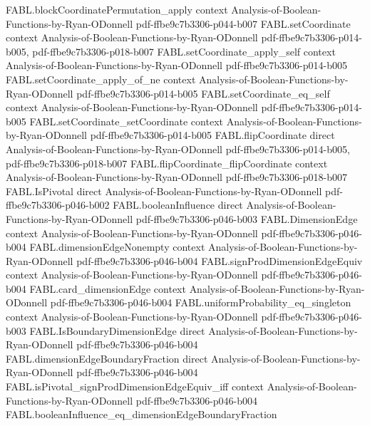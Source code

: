 \begin{theorem}
\proofstep
  {FABL.blockCoordinatePermutation_apply}
  {context}
  {Analysis-of-Boolean-Functions-by-Ryan-ODonnell}
  {pdf-ffbe9c7b3306-p044-b007}
\proofstep
  {FABL.setCoordinate}
  {context}
  {Analysis-of-Boolean-Functions-by-Ryan-ODonnell}
  {pdf-ffbe9c7b3306-p014-b005,
    pdf-ffbe9c7b3306-p018-b007}
\proofstep
  {FABL.setCoordinate_apply_self}
  {context}
  {Analysis-of-Boolean-Functions-by-Ryan-ODonnell}
  {pdf-ffbe9c7b3306-p014-b005}
\proofstep
  {FABL.setCoordinate_apply_of_ne}
  {context}
  {Analysis-of-Boolean-Functions-by-Ryan-ODonnell}
  {pdf-ffbe9c7b3306-p014-b005}
\proofstep
  {FABL.setCoordinate_eq_self}
  {context}
  {Analysis-of-Boolean-Functions-by-Ryan-ODonnell}
  {pdf-ffbe9c7b3306-p014-b005}
\proofstep
  {FABL.setCoordinate_setCoordinate}
  {context}
  {Analysis-of-Boolean-Functions-by-Ryan-ODonnell}
  {pdf-ffbe9c7b3306-p014-b005}
\proofstep
  {FABL.flipCoordinate}
  {direct}
  {Analysis-of-Boolean-Functions-by-Ryan-ODonnell}
  {pdf-ffbe9c7b3306-p014-b005,
    pdf-ffbe9c7b3306-p018-b007}
\proofstep
  {FABL.flipCoordinate_flipCoordinate}
  {context}
  {Analysis-of-Boolean-Functions-by-Ryan-ODonnell}
  {pdf-ffbe9c7b3306-p018-b007}
\proofstep
  {FABL.IsPivotal}
  {direct}
  {Analysis-of-Boolean-Functions-by-Ryan-ODonnell}
  {pdf-ffbe9c7b3306-p046-b002}
\proofstep
  {FABL.booleanInfluence}
  {direct}
  {Analysis-of-Boolean-Functions-by-Ryan-ODonnell}
  {pdf-ffbe9c7b3306-p046-b003}
\proofstep
  {FABL.DimensionEdge}
  {context}
  {Analysis-of-Boolean-Functions-by-Ryan-ODonnell}
  {pdf-ffbe9c7b3306-p046-b004}
\proofstep
  {FABL.dimensionEdgeNonempty}
  {context}
  {Analysis-of-Boolean-Functions-by-Ryan-ODonnell}
  {pdf-ffbe9c7b3306-p046-b004}
\proofstep
  {FABL.signProdDimensionEdgeEquiv}
  {context}
  {Analysis-of-Boolean-Functions-by-Ryan-ODonnell}
  {pdf-ffbe9c7b3306-p046-b004}
\proofstep
  {FABL.card_dimensionEdge}
  {context}
  {Analysis-of-Boolean-Functions-by-Ryan-ODonnell}
  {pdf-ffbe9c7b3306-p046-b004}
\proofstep
  {FABL.uniformProbability_eq_singleton}
  {context}
  {Analysis-of-Boolean-Functions-by-Ryan-ODonnell}
  {pdf-ffbe9c7b3306-p046-b003}
\proofstep
  {FABL.IsBoundaryDimensionEdge}
  {direct}
  {Analysis-of-Boolean-Functions-by-Ryan-ODonnell}
  {pdf-ffbe9c7b3306-p046-b004}
\proofstep
  {FABL.dimensionEdgeBoundaryFraction}
  {direct}
  {Analysis-of-Boolean-Functions-by-Ryan-ODonnell}
  {pdf-ffbe9c7b3306-p046-b004}
\proofstep
  {FABL.isPivotal_signProdDimensionEdgeEquiv_iff}
  {context}
  {Analysis-of-Boolean-Functions-by-Ryan-ODonnell}
  {pdf-ffbe9c7b3306-p046-b004}
\proofstep
  {FABL.booleanInfluence_eq_dimensionEdgeBoundaryFraction}

\end{theorem}
